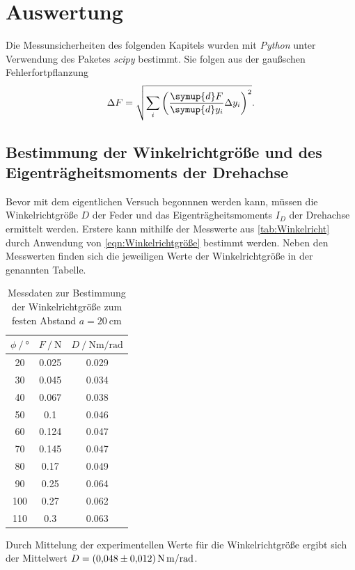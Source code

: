 \section{Auswertung}
\label{sec:Auswertung}
Die Messunsicherheiten des folgenden Kapitels wurden mit \textit{Python} unter Verwendung des Paketes \textit{scipy} \cite{scipy} bestimmt. Sie folgen aus der gaußschen
Fehlerfortpflanzung
\begin{equation}
  \label{eqn:Gauss}
  \Delta F = \sqrt{\sum_i\left(\frac{\symup{d}F}{\symup{d}y_i}\Delta y_i \right)^2}.
\end{equation} 

\subsection{Bestimmung der Winkelrichtgröße und des Eigenträgheitsmoments der Drehachse}
\label{subsec:A_Apparatenkonstanten}
Bevor mit dem eigentlichen Versuch begonnnen werden kann, müssen die Winkelrichtgröße $D$ der Feder und das Eigenträgheitsmoments $I_D$ der Drehachse ermittelt werden. 
Erstere kann mithilfe der Messwerte aus \autoref{tab:Winkelricht} durch Anwendung von \autoref{eqn:Winkelrichtgröße} bestimmt werden. Neben den Messwerten finden sich die jeweiligen 
Werte der Winkelrichtgröße in der genannten Tabelle.
\begin{table}
  \centering
  \caption{Messdaten zur Bestimmung der Winkelrichtgröße zum festen Abstand $a = \qty{20}{\centi\metre}$}
  \label{tab:Winkelricht}
  \begin{tabular}{S[table-format = 3.0] S[table-format = 1.3] S}
    \toprule
    {$\phi \mathbin{/} °$} & {$F \mathbin{/} \unit{\newton}$} & {$D \mathbin{/} \unit{\newton\metre\per\radian}$} \\
     & 0.025 & 0.029 \\
     30 & 0.045 & 0.034 \\
     40 & 0.067 & 0.038 \\
     50 & 0.1   & 0.046 \\
     60 & 0.124 & 0.047 \\
     70 & 0.145 & 0.047 \\
     80 & 0.17  & 0.049 \\
     90 & 0.25  & 0.064 \\
    100 & 0.27  & 0.062 \\
    110 & 0.3   & 0.063 \\
    \bottomrule
  \end{tabular}
\end{table}
Durch Mittelung der experimentellen Werte für die Winkelrichtgröße ergibt sich der Mittelwert $D = \qty{0.048 +- 0.012}{\newton\metre\per\radian}$.

